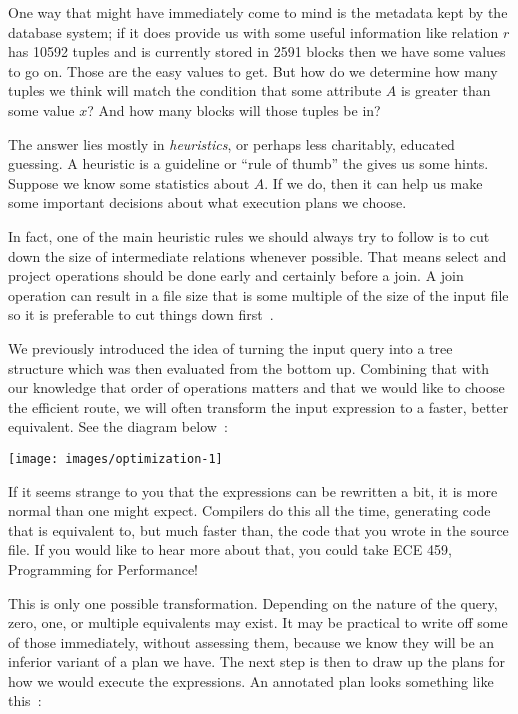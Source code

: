 \documentclass[a4paper]{report}
\begin{document}
One way that might have immediately come to mind is the metadata kept by the database system; if it does provide us with some useful information like relation $r$ has 10592 tuples and is currently stored in 2591 blocks then we have some values to go on. Those are the easy values to get. But how do we determine how many tuples we think will match the condition that some attribute $A$ is greater than some value $x$? And how many blocks will those tuples be in?

The answer lies mostly in \textit{heuristics}, or perhaps less charitably, educated guessing. A heuristic is a guideline or ``rule of thumb'' the gives us some hints. Suppose we know some statistics about $A$. If we do, then it can help us make some important decisions about what execution plans we choose. 

In fact, one of the main heuristic rules we should always try to follow is to cut down the size of intermediate relations whenever possible. That means select and project operations should be done early and certainly before a join. A join operation can result in a file size that is some multiple of the size of the input file so it is preferable to cut things down first~\cite{fds}.

We previously introduced the idea of turning the input query into a tree structure which was then evaluated from the bottom up. Combining that with our knowledge that order of operations matters and that we would like to choose the efficient route, we will often transform the input expression to a faster, better equivalent. See the diagram below~\cite{dsc}:

\begin{center}
\texttt{[image: images/optimization-1]}
\end{center}

If it seems strange to you that the expressions can be rewritten a bit, it is more normal than one might expect. Compilers do this all the time, generating code that is equivalent to, but much faster than, the code that you wrote in the source file. If you would like to hear more about that, you could take ECE 459, Programming for Performance! 

This is only one possible transformation. Depending on the nature of the query, zero, one, or multiple equivalents may exist. It may be practical to write off some of those immediately, without assessing them, because we know they will be an inferior variant of a plan we have. The next step is then to draw up the plans for how we would execute the expressions. An annotated plan looks something like this~\cite{dsc}:
\end{document}
